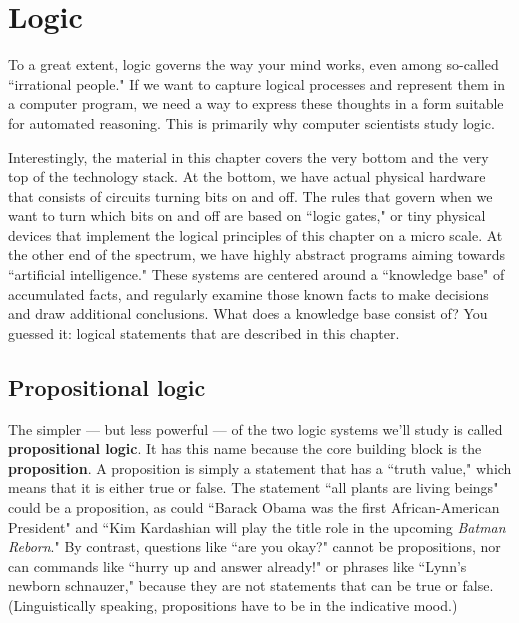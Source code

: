 

\chapter{Logic}

To a great extent, logic governs the way your mind works, even among
so-called ``irrational people." If we want to capture logical processes and
represent them in a computer program, we need a way to express these
thoughts in a form suitable for automated reasoning. This is primarily why
computer scientists study logic.

Interestingly, the material in this chapter covers the very bottom and the
very top of the technology stack. At the bottom, we have actual physical
hardware that consists of circuits turning bits on and off. The rules that
govern when we want to turn which bits on and off are based on ``logic
gates," or tiny physical devices that implement the logical principles of
this chapter on a micro scale. At the other end of the spectrum, we have
highly abstract programs aiming towards ``artificial intelligence." These
systems are centered around a ``knowledge base" of accumulated facts, and
regularly examine those known facts to make decisions and draw additional
conclusions. What does a knowledge base consist of? You guessed it: logical
statements that are described in this chapter.

\section{Propositional logic} 

The simpler --- but less powerful --- of the two logic systems we'll study
is called \textbf{propositional logic}. It has this name because the core
building block is the \textbf{proposition}. A proposition is simply a
statement that has a ``truth value," which means that it is either true or
false. The statement ``all plants are living beings" could be a
proposition, as could ``Barack Obama was the first African-American
President" and ``Kim Kardashian will play the title role in the upcoming
\textit{Batman Reborn}." By contrast, questions like ``are you okay?"
cannot be propositions, nor can commands like ``hurry up and answer
already!" or phrases like ``Lynn's newborn schnauzer," because they are not
statements that can be true or false. (Linguistically speaking, propositions
have to be in the indicative mood.)

